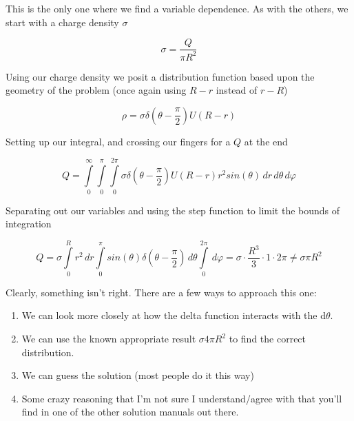 This is the only one where we find a variable dependence.  As with the
others, we start with a charge density $\sigma$

\begin{equation}
  \sigma = \frac{Q}{\pi R^2}
\end{equation}

Using our charge density we posit a distribution function based upon
the geometry of the problem (once again using $R-r$ instead of $r-R$)

\begin{equation}
  \rho = \sigma \delta(\theta - \frac \pi 2) U(R - r)
\end{equation}

Setting up our integral, and crossing our fingers for a $Q$ at the end

\begin{equation}
  Q =
  \int\limits_0^\infty
  \int\limits_0^\pi
  \int\limits_0^{2\pi}
  \sigma \delta(\theta - \frac \pi 2) U(R - r)
  r^2sin(\theta)
  \, dr
  \, d\theta
  \, d\varphi
\end{equation}

Separating out our variables and using the step function to limit the
bounds of integration

\begin{equation}
  Q =
  \sigma
  \int\limits_0^R
  r^2
  \, dr
  \int\limits_0^\pi
  sin(\theta)
  \delta(\theta - \frac \pi 2)
  \, d\theta
  \int\limits_0^{2\pi}
  \, d\varphi
  = \sigma \cdot \frac{R^3}{3} \cdot 1 \cdot 2\pi
  \neq \sigma \pi R^2
\end{equation}

Clearly, something isn't right.  There are a few ways to approach this one:

\begin{enumerate}
  \item We can look more closely at how the delta function interacts
    with the d$\theta$.

  \item We can use the known appropriate result $\sigma 4 \pi R^2$ to
    find the correct distribution.

  \item We can guess the solution (most people do it this way)

  \item Some crazy reasoning that I'm not sure I understand/agree with
    that you'll find in one of the other solution manuals out there.
\end{enumerate}

